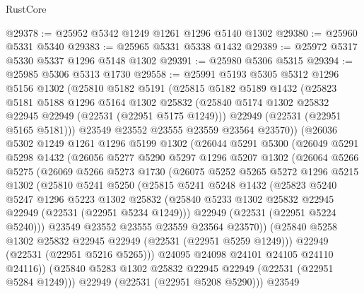 \begin{lexlean}{RustCore}
\begin{coremodule}
@29378 := @25952 @5342 @1249 @1261 @1296 @5140 @1302
@29380 := @25960 @5331 @5340
@29383 := @25965 @5331 @5338 @1432
@29389 := @25972 @5317 @5330 @5337 @1296 @5148 @1302
@29391 := @25980 @5306 @5315
@29394 := @25985 @5306 @5313 @1730
@29558 := @25991
    @5193
    @5305
    @5312
    @1296
    @5156
    @1302
    (@25810
      @5182
      @5191
      (@25815
        @5182
        @5189
        @1432
        (@25823
          @5181
          @5188
          @1296
          @5164
          @1302
          @25832
          (@25840 @5174 @1302 @25832 @22945 @22949 (@22531 (@22951 @5175 @1249)))
          @22949
          (@22531 (@22951 @5165 @5181)))
        @23549
        @23552
        @23555
        @23559
        @23564
        @23570))
    (@26036
      @5302
      @1249
      @1261
      @1296
      @5199
      @1302
      (@26044
        @5291
        @5300
        (@26049
          @5291
          @5298
          @1432
          (@26056
            @5277
            @5290
            @5297
            @1296
            @5207
            @1302
            (@26064
              @5266
              @5275
              (@26069
                @5266
                @5273
                @1730
                (@26075
                  @5252
                  @5265
                  @5272
                  @1296
                  @5215
                  @1302
                  (@25810
                    @5241
                    @5250
                    (@25815
                      @5241
                      @5248
                      @1432
                      (@25823
                        @5240
                        @5247
                        @1296
                        @5223
                        @1302
                        @25832
                        (@25840 @5233 @1302 @25832 @22945 @22949 (@22531 (@22951 @5234 @1249)))
                        @22949
                        (@22531 (@22951 @5224 @5240)))
                      @23549
                      @23552
                      @23555
                      @23559
                      @23564
                      @23570))
                  (@25840 @5258 @1302 @25832 @22945 @22949 (@22531 (@22951 @5259 @1249)))
                  @22949
                  (@22531 (@22951 @5216 @5265)))
                @24095
                @24098
                @24101
                @24105
                @24110
                @24116))
            (@25840 @5283 @1302 @25832 @22945 @22949 (@22531 (@22951 @5284 @1249)))
            @22949
            (@22531 (@22951 @5208 @5290)))
          @23549

\end{coremodule}
\end{lexlean}

